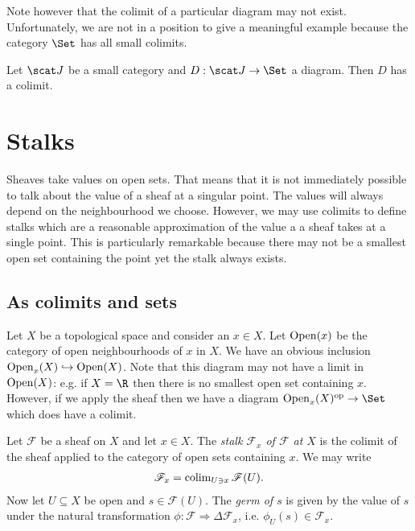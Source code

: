 \documentclass{article}
\begin{document}
Note however that the colimit of a particular diagram may not exist. Unfortunately, we
are not in a position to give a meaningful example because the category $\Set$ has
all small colimits.

\begin{theorem}
  Let $\scat J$ be a small category and $D:\scat J\to\Set$ a diagram. Then $D$ has a colimit.
\end{theorem}

\section{Stalks}

Sheaves take values on open sets. That means that it is not immediately
possible to talk about the value of a sheaf at a singular point. The
values will always depend on the neighbourhood we choose. However,
we may use colimits to define stalks which are a reasonable approximation
of the value a a sheaf takes at a single point. This is particularly
remarkable because there may not be a smallest open set containing
the point yet the stalk always exists.

\subsection{As colimits and sets}

Let $X$ be a topological space and consider an $x\in X$. Let
$\operatorname{Open}(x)$ be the category of open neighbourhoods of $x$ in $X$.
We have an obvious inclusion $\operatorname{Open}_x(X)\hookrightarrow\operatorname{Open}(X)$.
Note that this diagram may not have a limit in $\operatorname{Open}(X)$:
e.g. if $X=\R$ then there is no smallest open set containing
$x$. However, if we apply the sheaf then we have a diagram
$\Open_x(X)^\text{op}\to\Set$ which does have a colimit.

\begin{definition}
  Let $\mathscr F$ be a sheaf on $X$ and let $x\in X$.
  The \emph{stalk $\mathscr F_x$ of $\mathscr F$ at $X$} is the
  colimit of the sheaf applied to the category of open sets containing $x$.
  We may write
  \begin{align*}
    \mathscr F_x = \operatorname{colim}_{U\ni x} \mathscr F(U).
  \end{align*}
  Now let $U\subseteq X$ be open and $s\in\mathscr F(U)$.
  The \emph{germ of $s$} is given by the value of $s$ under the
  natural transformation $\phi:\mathscr F\Rightarrow\Delta\mathscr F_x$,
  i.e. $\phi_U(s)\in\mathscr F_x$.
\end{definition}
\end{document}
